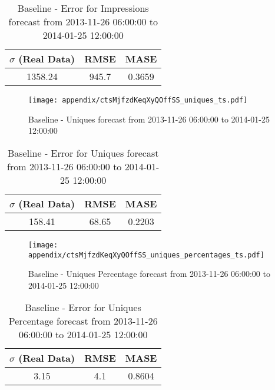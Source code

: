 \begin{table}[H]
\centering
\footnotesize
\begin{tabular}{ccc}
$\sigma$ (Real Data) & RMSE & MASE   \\ \hline
1358.24 & 945.7 & 0.3659 \\
\end{tabular}

\vspace{0.5cm}

\caption[]{
Baseline - Error for Impressions forecast from 2013-11-26 06:00:00 to 2014-01-25 12:00:00}
\end{table}

\begin{figure}[H] \begin{center} \leavevmode
\texttt{[image: appendix/ctsMjfzdKeqXyQOffSS\_uniques\_ts.pdf]} \caption[]{
Baseline - Uniques forecast from 2013-11-26 06:00:00 to 2014-01-25 12:00:00} \label{fig:appendix/ctsMjfzdKeqXyQOffSS_uniques_ts.pdf} \end{center}
\end{figure}

\begin{table}[H]
\centering
\footnotesize
\begin{tabular}{ccc}
$\sigma$ (Real Data) & RMSE & MASE   \\ \hline
158.41 & 68.65 & 0.2203 \\
\end{tabular}

\vspace{0.5cm}

\caption[]{
Baseline - Error for Uniques forecast from 2013-11-26 06:00:00 to 2014-01-25 12:00:00}
\end{table}

\begin{figure}[H] \begin{center} \leavevmode
\texttt{[image: appendix/ctsMjfzdKeqXyQOffSS\_uniques\_percentages\_ts.pdf]} \caption[]{
Baseline - Uniques Percentage forecast from 2013-11-26 06:00:00 to 2014-01-25 12:00:00} \label{fig:appendix/ctsMjfzdKeqXyQOffSS_uniques_percentages_ts.pdf} \end{center}
\end{figure}

\begin{table}[H]
\centering
\footnotesize
\begin{tabular}{ccc}
$\sigma$ (Real Data) & RMSE & MASE   \\ \hline
3.15 & 4.1 & 0.8604 \\
\end{tabular}

\vspace{0.5cm}

\caption[]{
Baseline - Error for Uniques Percentage forecast from 2013-11-26 06:00:00 to 2014-01-25 12:00:00}
\end{table}

